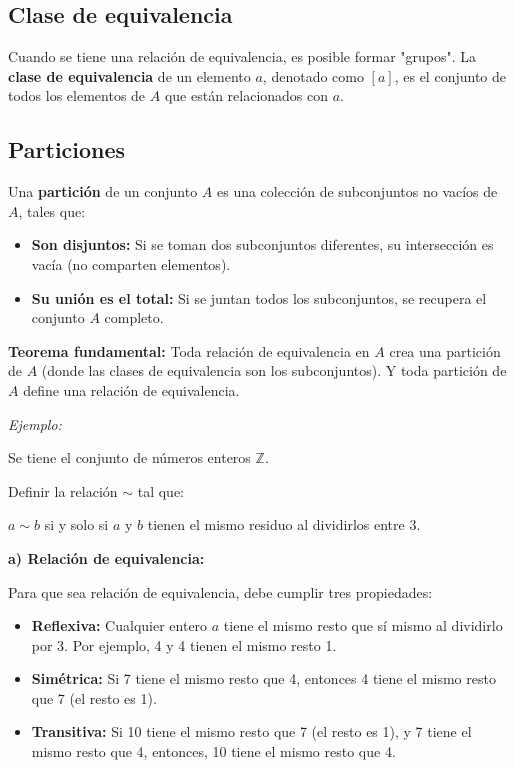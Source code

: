 \documentclass{article}
\begin{document}
\subsection{Clase de equivalencia}

Cuando se tiene una relación de equivalencia, es posible formar "grupos". La \textbf{clase de equivalencia} de un elemento $a$, denotado como $\left[a\right]$, es el conjunto de todos los elementos de $A$ que están relacionados con $a$.

\subsection{Particiones}

Una \textbf{partición} de un conjunto $A$ es una colección de subconjuntos no vacíos de $A$, tales que:

\begin{itemize}
    \item \textbf{Son disjuntos:} Si se toman dos subconjuntos diferentes, su intersección es vacía (no comparten elementos).
    \item \textbf{Su unión es el total:} Si se juntan todos los subconjuntos, se recupera el conjunto $A$ completo.
\end{itemize}

\textbf{Teorema fundamental:} Toda relación de equivalencia en $A$ crea una partición de $A$ (donde las clases de equivalencia son los subconjuntos). Y toda partición de $A$ define una relación de equivalencia.

\textit{Ejemplo:}

Se tiene el conjunto de números enteros $\mathbb{Z}$.

Definir la relación $\sim$ tal que:

$a \sim b$ si y solo si $a \text{ y } b$ tienen el mismo residuo al dividirlos entre 3.

\textbf{a) Relación de equivalencia:}

Para que sea relación de equivalencia, debe cumplir tres propiedades:

\begin{itemize}
    \item \textbf{Reflexiva:} Cualquier entero $a$ tiene el mismo resto que sí mismo al dividirlo por 3. Por ejemplo, 4 y 4 tienen el mismo resto 1.
    \item \textbf{Simétrica:} Si 7 tiene el mismo resto que 4, entonces 4 tiene el mismo resto que 7 (el resto es 1).
    \item \textbf{Transitiva:} Si 10 tiene el mismo resto que 7 (el resto es 1), y 7 tiene el mismo resto que 4, entonces, 10 tiene el mismo resto que 4.
\end{itemize}
\end{document}
